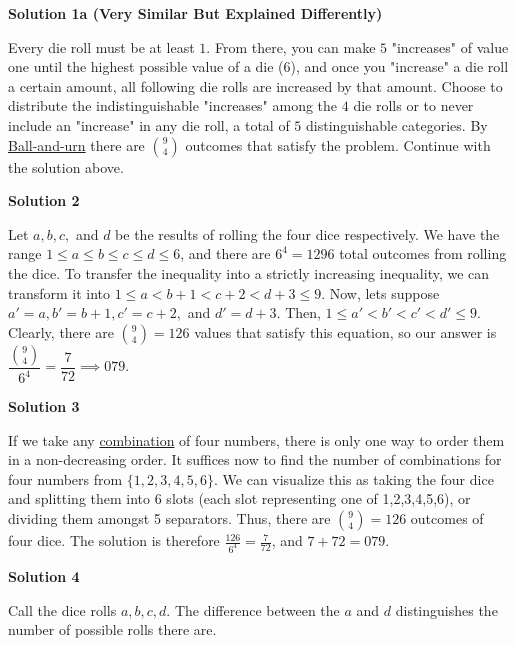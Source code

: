 \begin{enumerate}
\textbf{Solution 1a (Very Similar But Explained Differently)}

Every die roll must be at least $1$. From there, you can make $5$ "increases" of value one until the highest possible value of a die ($6$), and once you "increase" a die roll a certain amount, all following die rolls are increased by that amount. Choose to distribute the indistinguishable "increases" among the $4$ die rolls or to never include an "increase" in any die roll, a total of $5$ distinguishable categories. By \href{https://artofproblemsolving.com/wiki/index.php?title=Ball-and-urn}{Ball-and-urn} there are $\binom{9}{4}$ outcomes that satisfy the problem. Continue with the solution above.

 



\textbf{Solution 2}

Let $a, b, c,$ and $d$ be the results of rolling the four dice respectively. We have the range $1\leq a\leq b\leq c\leq d\leq 6$, and there are $6^4=1296$ total outcomes from rolling the dice. To transfer the inequality into a strictly increasing inequality, we can transform it into $1\leq a<b+1<c+2<d+3\leq 9$. Now, lets suppose $a'=a, b'=b+1, c'=c+2,$ and $d'=d+3$. Then, $1\leq a'<b'<c'<d' \leq 9$. Clearly, there are $\binom{9}{4}=126$ values that satisfy this equation, so our answer is $\dfrac{\binom{9}{4}}{6^4} = {\dfrac{7}{72}}\implies \boxed{079}$.

 



\textbf{Solution 3}

If we take any \href{https://artofproblemsolving.com/wiki/index.php?title=Combination}{combination} of four numbers, there is only one way to order them in a non-decreasing order. It suffices now to find the number of combinations for four numbers from $\{1,2,3,4,5,6\}$. We can visualize this as taking the four dice and splitting them into 6 slots (each slot representing one of {1,2,3,4,5,6}), or dividing them amongst 5 separators. Thus, there are ${9\choose4} = 126$ outcomes of four dice. The solution is therefore $\frac{126}{6^4} = \frac{7}{72}$, and $7 + 72 = \boxed{079}$.

 



\textbf{Solution 4}

Call the dice rolls $a, b, c, d$. The difference between the $a$ and $d$ distinguishes the number of possible rolls there are. 


\end{enumerate}
